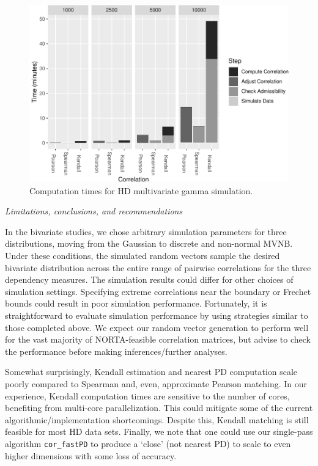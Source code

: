 \documentclass{article}
\begin{document}
\begin{figure}
\centering
\includegraphics{ch040-largeDfig-1.pdf}
\caption{\label{fig:ch040-largeDfig}Computation times for HD
multivariate gamma simulation.}
\end{figure}

\emph{Limitations, conclusions, and recommendations}

In the bivariate studies, we chose arbitrary simulation parameters for
three distributions, moving from the Gaussian to discrete and non-normal
MVNB. Under these conditions, the simulated random vectors sample the
desired bivariate distribution across the entire range of pairwise
correlations for the three dependency measures. The simulation results
could differ for other choices of simulation settings. Specifying
extreme correlations near the boundary or Frechet bounds could result in
poor simulation performance. Fortunately, it is straightforward to
evaluate simulation performance by using strategies similar to those
completed above. We expect our random vector generation to perform well
for the vast majority of NORTA-feasible correlation matrices, but advise
to check the performance before making inferences/further analyses.

Somewhat surprisingly, Kendall estimation and nearest PD computation
scale poorly compared to Spearman and, even, approximate Pearson
matching. In our experience, Kendall computation times are sensitive to
the number of cores, benefiting from multi-core parallelization. This
could mitigate some of the current algorithmic/implementation
shortcomings. Despite this, Kendall matching is still feasible for most
HD data sets. Finally, we note that one could use our single-pass
algorithm \texttt{cor\_fastPD} to produce a `close' (not nearest PD) to
scale to even higher dimensions with some loss of accuracy.
\end{document}
